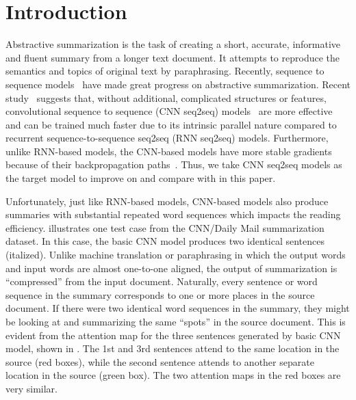 \section{Introduction}
\label{sec:intro}

Abstractive summarization is the task of creating a short, accurate,
informative and fluent summary from a longer text document.
It attempts to reproduce the semantics and topics of original text
by paraphrasing. 
Recently, sequence to sequence
models~\cite{RushCW15,ChopraAR16,NallapatiZSGX16,SeeLM17,PaulusXS17}
have made great progress on abstractive summarization.
Recent study~\cite{bai2018empirical} suggests that, 
without additional, complicated structures or features,
convolutional sequence to sequence 
(CNN seq2seq) models~\cite{gehring2017convs2s,FanGA18,LiuLZ18} 
are more effective and can be trained much faster due to 
its intrinsic parallel nature 
compared to recurrent sequence-to-sequence seq2seq (RNN seq2seq) models.
Furthermore, unlike RNN-based models, 
the CNN-based models have more stable gradients 
because of their backpropagation paths~\cite{bai2018empirical, LiuLZ18}. 
Thus, we take CNN seq2seq models as the target model to improve on and
compare with
in this paper.

Unfortunately, just like RNN-based models, CNN-based models also produce
summaries with substantial repeated word sequences which impacts the reading efficiency.
 illustrates one 
test case from the CNN/Daily Mail summarization dataset. 
In this case, the basic CNN model produces two 
identical sentences (italized). 
Unlike machine translation or paraphrasing in which the output words
and input words are almost one-to-one aligned, the output of summarization
is ``compressed'' from the input document. Naturally, every sentence or 
word sequence in the summary corresponds to one or more places in the source
document. If there were two identical word sequences in the summary,
they might be looking at and summarizing the same ``spots'' in the source document.
This is evident from the attention map for the three sentences generated by 
basic CNN model, shown in . 
The 1st and 3rd sentences attend to
the same location in the source (red boxes), while the second
sentence attends to another separate location in the source (green box). 
The two attention maps in the red boxes are very similar.

